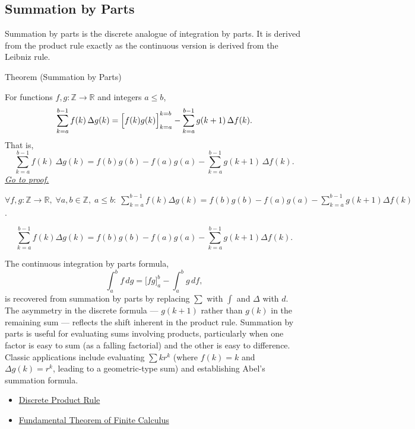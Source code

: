 
\subsection*{Summation by Parts}

\begin{exposition}
Summation by parts is the discrete analogue of integration by parts.
It is derived from the product rule exactly as the continuous version
is derived from the Leibniz rule.
\end{exposition}

\begin{theorembox}{Theorem (Summation by Parts)}
\begin{theorem}
\label{thm:summation-by-parts}
For functions \(f, g : \mathbb{Z} \to \mathbb{R}\) and integers \(a \le b\),
\[
\sum_{k=a}^{b-1} f(k)\,\Delta g(k)
=
\Bigl[f(k)g(k)\Bigr]_{k=a}^{k=b}
-
\sum_{k=a}^{b-1} g(k+1)\,\Delta f(k).
\]
That is,
\[
\sum_{k=a}^{b-1} f(k)\,\Delta g(k)
=
f(b)g(b)-f(a)g(a)
-
\sum_{k=a}^{b-1} g(k+1)\,\Delta f(k).
\]
\hyperref[prf:summation-by-parts]{\textit{Go to proof.}}
\end{theorem}
\end{theorembox}

\begin{remark*}
\(\forall f,g : \mathbb{Z}\to\mathbb{R},\; \forall a,b\in\mathbb{Z},\; a\le b:\;
\displaystyle\sum_{k=a}^{b-1}f(k)\Delta g(k)
= f(b)g(b) - f(a)g(a) - \sum_{k=a}^{b-1}g(k+1)\Delta f(k)\).
\end{remark*}

\begin{remark*}
\[
\sum_{k=a}^{b-1}f(k)\Delta g(k)
=f(b)g(b)-f(a)g(a)-\sum_{k=a}^{b-1}g(k+1)\Delta f(k).
\]
\end{remark*}

\begin{remark*}[Interpretation]
The continuous integration by parts formula,
\[
\int_a^b f\,dg = \bigl[fg\bigr]_a^b - \int_a^b g\,df,
\]
is recovered from summation by parts by replacing \(\sum\) with
\(\int\) and \(\Delta\) with \(d\). The asymmetry in the discrete
formula --- \(g(k+1)\) rather than \(g(k)\) in the remaining sum ---
reflects the shift inherent in the product rule.
Summation by parts is useful for evaluating sums involving products,
particularly when one factor is easy to sum (as a falling factorial)
and the other is easy to difference. Classic applications include
evaluating \(\sum k r^k\) (where \(f(k) = k\) and
\(\Delta g(k) = r^k\), leading to a geometric-type sum) and establishing
Abel's summation formula.
\end{remark*}

\begin{dependencies}
\begin{itemize}
  \item \hyperref[thm:discrete-product-rule]{Discrete Product Rule}
  \item \hyperref[thm:fundamental-theorem-finite-calculus]{Fundamental Theorem of Finite Calculus}
\end{itemize}
\end{dependencies}
